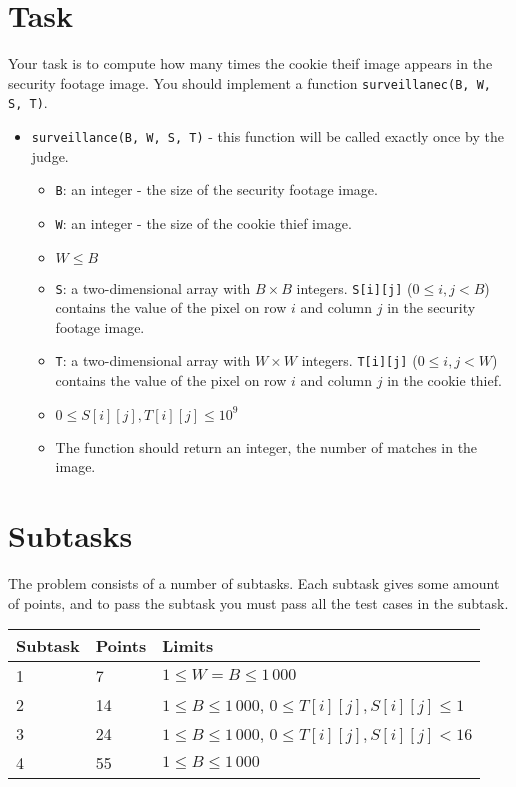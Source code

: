 \section*{Task}
Your task is to compute how many times the cookie theif image appears in the security footage image.
You should implement a function \texttt{surveillanec(B, W, S, T)}.
\begin{itemize}
  \item \texttt{surveillance(B, W, S, T)} - this function will be called exactly once by the judge.
  \begin{itemize}
    \item \texttt{B}: an integer - the size of the security footage image.
    \item \texttt{W}: an integer - the size of the cookie thief image.
    \item $W \le B$
    \item \texttt{S}: a two-dimensional array with $B \times B$ integers. \texttt{S[i][j]} ($0 \le i, j < B$) contains the value of the pixel on row $i$ and column $j$ in the security footage image.
    \item \texttt{T}: a two-dimensional array with $W \times W$ integers. \texttt{T[i][j]} ($0 \le i, j < W$) contains the value of the pixel on row $i$ and column $j$ in the cookie thief.
    \item $0 \le S[i][j], T[i][j] \le 10^9$
    \item The function should return an integer, the number of matches in the image.
  \end{itemize}
\end{itemize}

\section*{Subtasks}
The problem consists of a number of subtasks. Each subtask gives some amount of points, and to pass
the subtask you must pass all the test cases in the subtask.

\begin{tabular}{|l|l|l|}
  \hline
  \textbf{Subtask} & \textbf{Points} & \textbf{Limits} \\ \hline
  1 & 7 & $1 \le W = B \le 1\,000$  \\ \hline

  2 & 14 & $1 \le B \le 1\,000$, $0 \le T[i][j], S[i][j] \le 1$ \\ \hline

  3 & 24 & $1 \le B \le 1\,000$, $0 \le T[i][j], S[i][j] < 16$ \\ \hline

  4 & 55 & $1 \le B \le 1\,000$ \\ \hline

\end{tabular}

